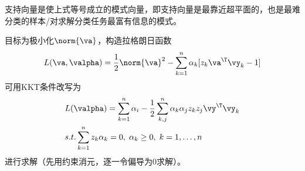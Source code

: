 支持向量是使上式等号成立的模式向量，即支持向量是最靠近超平面的，也是最难分类的样本/对求解分类任务最富有信息的模式。

目标为极小化$\norm{\va}$，构造拉格朗日函数
\[L(\va,\valpha)=\frac{1}{2}\norm{\va}^2-\sum_{k=1}^n\alpha_k[z_k\va^\T\vy_k-1]\]
可用KKT条件改写为
\[\begin{aligned}
&L(\valpha)=\sum_{k=1}^n\alpha_i-\frac{1}{2}\sum_{k,j}^n\alpha_k\alpha_jz_kz_j\vy^\T\vy_k\\
&s.t.\sum_{k=1}^nz_k\alpha_k=0,\;\alpha_k\geq 0,\;k=1,\ldots,n
\end{aligned}\]
进行求解（先用约束消元，逐一令偏导为$0$求解）。